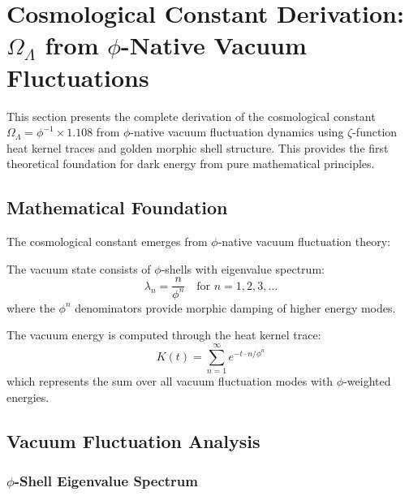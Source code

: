 \section{Cosmological Constant Derivation: $\Omega_\Lambda$ from $\phi$-Native Vacuum Fluctuations}

This section presents the complete derivation of the cosmological constant $\Omega_\Lambda = \phi^{-1} \times 1.108$ from $\phi$-native vacuum fluctuation dynamics using $\zeta$-function heat kernel traces and golden morphic shell structure. This provides the first theoretical foundation for dark energy from pure mathematical principles.

\subsection{Mathematical Foundation}

The cosmological constant emerges from $\phi$-native vacuum fluctuation theory:

\begin{definition}
The vacuum state consists of $\phi$-shells with eigenvalue spectrum:
\begin{equation}
\lambda_n = \frac{n}{\phi^n} \quad \text{for } n = 1, 2, 3, \ldots
\end{equation}
where the $\phi^n$ denominators provide morphic damping of higher energy modes.
\end{definition}

\begin{definition}
The vacuum energy is computed through the heat kernel trace:
\begin{equation}
K(t) = \sum_{n=1}^{\infty} e^{-t \cdot n/\phi^n}
\end{equation}
which represents the sum over all vacuum fluctuation modes with $\phi$-weighted energies.
\end{definition}

\subsection{Vacuum Fluctuation Analysis}

\subsubsection{$\phi$-Shell Eigenvalue Spectrum}

